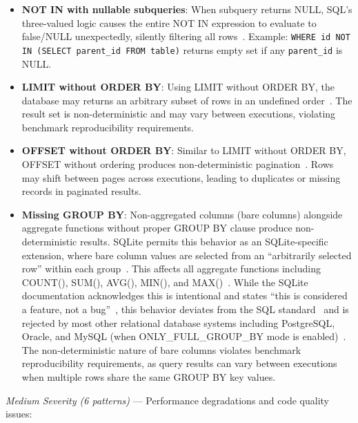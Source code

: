\documentclass[]{einformatica}
\begin{document}
\begin{itemize}
\item \textbf{NOT IN with nullable subqueries}: When subquery returns NULL, SQL's three-valued logic causes the entire NOT IN expression to evaluate to false/NULL unexpectedly, silently filtering all rows~\cite{karwin2010sqlantipatterns,date2012sqlrelational}. Example: \texttt{WHERE id NOT IN (SELECT parent\_id FROM table)} returns empty set if any \texttt{parent\_id} is NULL.

\item \textbf{LIMIT without ORDER BY}: Using LIMIT without ORDER BY, the database may returns an arbitrary subset of rows in an undefined order~\cite{karwin2010sqlantipatterns,iso9075_2_2016}. The result set is non-deterministic and may vary between executions, violating benchmark reproducibility requirements.

\item \textbf{OFFSET without ORDER BY}: Similar to LIMIT without ORDER BY, OFFSET without ordering produces non-deterministic pagination~\cite{karwin2010sqlantipatterns,iso9075_2_2016}. Rows may shift between pages across executions, leading to duplicates or missing records in paginated results.

\item \textbf{Missing GROUP BY}: Non-aggregated columns (bare columns) alongside aggregate functions without proper GROUP BY clause produce non-deterministic results. SQLite permits this behavior as an SQLite-specific extension, where bare column values are selected from an ``arbitrarily selected row'' within each group~\cite{sqliteBareColumns}. This affects all aggregate functions including COUNT(), SUM(), AVG(), MIN(), and MAX()~\cite{sqliteBareColumns}. While the SQLite documentation acknowledges this is intentional and states ``this is considered a feature, not a bug''~\cite{sqliteBareColumns}, this behavior deviates from the SQL standard~\cite{iso9075_2_2016} and is rejected by most other relational database systems including PostgreSQL, Oracle, and MySQL (when ONLY\_FULL\_GROUP\_BY mode is enabled)~\cite{postgresGroupBy,mysqlGroupByHandling}. The non-deterministic nature of bare columns violates benchmark reproducibility requirements, as query results can vary between executions when multiple rows share the same GROUP BY key values.
\end{itemize}

\textit{Medium Severity (6 patterns)} --- Performance degradations and code quality issues:
\end{document}
